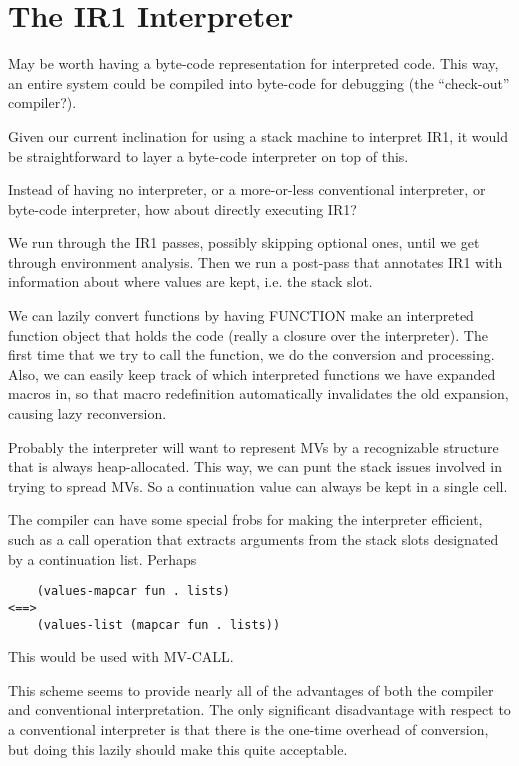 
\chapter{The IR1 Interpreter}

May be worth having a byte-code representation for interpreted code.  This way,
an entire system could be compiled into byte-code for debugging (the
``check-out'' compiler?).

Given our current inclination for using a stack machine to interpret IR1, it
would be straightforward to layer a byte-code interpreter on top of this.


Instead of having no interpreter, or a more-or-less conventional interpreter,
or byte-code interpreter, how about directly executing IR1?

We run through the IR1 passes, possibly skipping optional ones, until we get
through environment analysis.  Then we run a post-pass that annotates IR1 with
information about where values are kept, i.e. the stack slot.

We can lazily convert functions by having FUNCTION make an interpreted function
object that holds the code (really a closure over the interpreter).  The first
time that we try to call the function, we do the conversion and processing.
Also, we can easily keep track of which interpreted functions we have expanded
macros in, so that macro redefinition automatically invalidates the old
expansion, causing lazy reconversion.

Probably the interpreter will want to represent MVs by a recognizable structure
that is always heap-allocated.  This way, we can punt the stack issues involved
in trying to spread MVs.  So a continuation value can always be kept in a
single cell.

The compiler can have some special frobs for making the interpreter efficient,
such as a call operation that extracts arguments from the stack
slots designated by a continuation list.  Perhaps 

\begin{verbatim}
    (values-mapcar fun . lists)
<==>
    (values-list (mapcar fun . lists))
\end{verbatim}

This would be used with MV-CALL.


This scheme seems to provide nearly all of the advantages of both the compiler
and conventional interpretation.  The only significant disadvantage with
respect to a conventional interpreter is that there is the one-time overhead of
conversion, but doing this lazily should make this quite acceptable.

